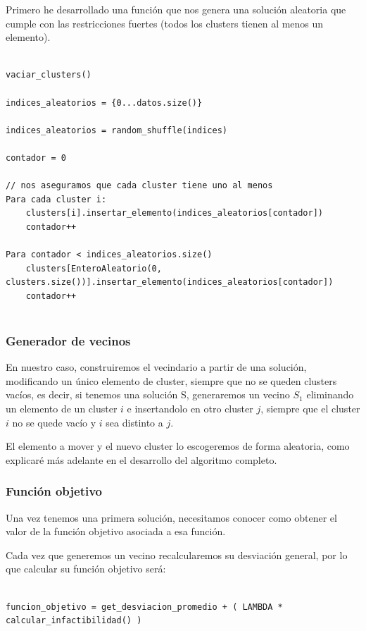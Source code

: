 \documentclass[12pt, spanish]{article}
\begin{document}
 Primero he desarrollado una función que nos genera una solución aleatoria que cumple con las restricciones fuertes (todos los clusters tienen al menos un elemento).
 
 \begin{lstlisting}

vaciar_clusters()

indices_aleatorios = {0...datos.size()}

indices_aleatorios = random_shuffle(indices)

contador = 0

// nos aseguramos que cada cluster tiene uno al menos
Para cada cluster i:
	clusters[i].insertar_elemento(indices_aleatorios[contador])
	contador++
	
Para contador < indices_aleatorios.size()
	clusters[EnteroAleatorio(0, clusters.size())].insertar_elemento(indices_aleatorios[contador])
	contador++
	

\end{lstlisting}
 
 
\subsubsection{Generador de vecinos}

En nuestro caso, construiremos el vecindario a partir de una solución, modificando un único elemento de cluster, siempre que no se queden clusters vacíos, es decir, si tenemos una solución S, generaremos un vecino $S_1$ eliminando un elemento de un cluster $i$ e insertandolo en otro cluster $j$, siempre que el cluster $i$ no se quede vacío y $i$ sea distinto a $j$.

El elemento a mover y el nuevo cluster lo escogeremos de forma aleatoria, como explicaré más adelante en el desarrollo del algoritmo completo.

 
\subsubsection{Función objetivo} 
 
Una vez tenemos una primera solución, necesitamos conocer como obtener el valor de la función objetivo asociada a esa función.

Cada vez que generemos un vecino recalcularemos su desviación general, por lo que calcular su función objetivo será:

\begin{lstlisting}

funcion_objetivo = get_desviacion_promedio + ( LAMBDA * calcular_infactibilidad() )

 \end{lstlisting}
\end{document}
